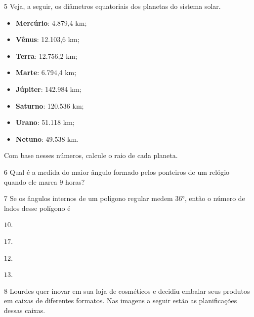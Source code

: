 
\num{5}  Veja, a seguir, os diâmetros equatoriais dos planetas do sistema
solar.

\begin{myquote}
\begin{itemize}
  \item \textbf{Mercúrio}: 4.879,4 km;
  \item \textbf{Vênus}: 12.103,6 km;
  \item \textbf{Terra}: 12.756,2 km;
  \item \textbf{Marte}: 6.794,4 km;
  \item \textbf{Júpiter}: 142.984 km;
  \item \textbf{Saturno}: 120.536 km;
  \item \textbf{Urano}: 51.118 km;
  \item \textbf{Netuno}: 49.538 km.
\end{itemize}
\end{myquote}

Com base nesses números, calcule o raio de cada planeta.


\num{6}  Qual é a medida do maior ângulo formado pelos ponteiros de um relógio
quando ele marca $9$ horas?


\num{7}  Se os ângulos internos de um polígono regular medem $36$°, então o
número de lados desse polígono é

\begin{escolha}
\item $10$. 
\item $17$.
\item $12$.
\item $13$.
\end{escolha}

\num{8}  Lourdes quer inovar em sua loja de cosméticos e decidiu embalar seus
produtos em caixas de diferentes formatos. Nas imagens a seguir estão as
planificações dessas caixas.

